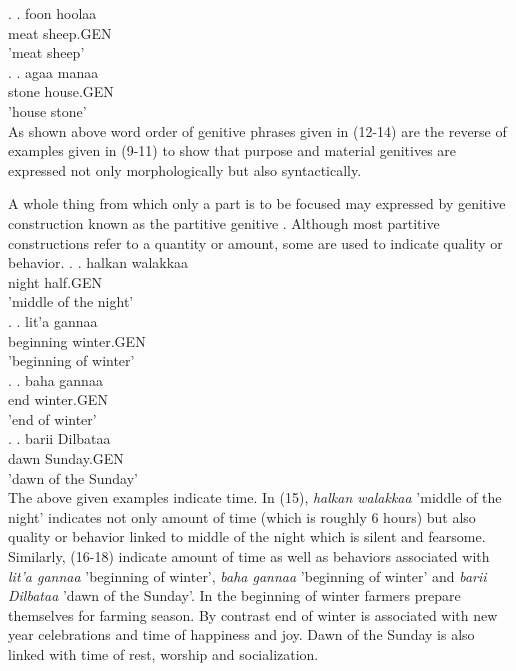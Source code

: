 \documentclass[11pt,a4paper]{article}
\begin{document}
	\ex.
	\ag.
	foon hoolaa\\
	meat sheep.GEN\\
	'meat sheep'\\
	
	\ex.
	\ag.
	agaa manaa\\
	stone house.GEN\\
	'house stone'\\
	
	As shown above word order of genitive phrases given in (12-14) are the reverse of examples given in (9-11) to show that purpose and material genitives are expressed not only morphologically but also syntactically.
	
	A whole thing from which only a part is to be focused may expressed by genitive construction known as the partitive genitive \cite[:69]{greenlee1950genitive}. Although most partitive 
	constructions refer to a quantity or amount, some are used to indicate quality or behavior.  
	\ex.
	\ag.
	halkan walakkaa\\
	night half.GEN\\
	'middle of the night'\\
	
	\ex.
	\ag.
	lit'a gannaa \\
	beginning winter.GEN\\
	'beginning of winter'\\
	
	\ex.
	\ag.
	baha gannaa\\
	end winter.GEN\\
	'end of winter'\\
	
	\ex.
	\ag.
	barii Dilbataa\\
	dawn Sunday.GEN\\
	'dawn of the Sunday'\\
	
	The above given examples indicate time. In (15), \emph{halkan walakkaa} 'middle of the night' indicates not only amount of time (which is roughly 6 hours) but also quality or behavior linked to middle of the night which is silent and fearsome. Similarly, (16-18) indicate amount of time as well as behaviors associated with \emph{lit'a gannaa} 'beginning of winter', \emph{baha gannaa} 'beginning of winter' and \emph{barii Dilbataa} 'dawn of the Sunday'. In the beginning of winter farmers prepare themselves for farming season. By contrast end of winter is associated with new year celebrations and time of happiness and joy. Dawn of the Sunday is also linked with time of rest, worship and socialization. 
		
\end{document}
